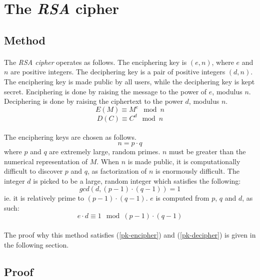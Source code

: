 \documentclass[a4paper, 12pt]{article}
\begin{document}
\section{The \textit{RSA} cipher}
\paragraph*{}

\subsection{Method}
\paragraph*{}
The \textit{RSA cipher} operates as follows. The enciphering key is $(e, n)$, where $e$ and $n$ are positive integers. 
The deciphering key is a pair of positive integers $(d, n)$. The enciphering key is made public by all users, while the
 deciphering key is kept secret. Enciphering is done by raising the message to the power of $e$, modulus $n$. 
Deciphering is done by raising the ciphertext to the power $d$, modulus $n$.
$$E(M) \equiv M^{e} \mod n$$
$$D(C) \equiv C^{d} \mod n$$

\paragraph*{}
The enciphering keys are chosen as follows.
$$n = p \cdot q$$
where $p$ and $q$ are extremely large, random primes. $n$ must be greater than the numerical representation of $M$. 
When $n$ is made public, it is computationally difficult to discover $p$ and $q$, as factorization of $n$ is 
enormously difficult. The integer $d$ is picked to be a large, random integer which satisfies the following:
$$gcd(d, (p - 1) \cdot (q - 1)) = 1$$
ie. it is relatively prime to $(p - 1) \cdot (q - 1)$. $e$ is computed from $p$, $q$ and $d$, as such:
$$e \cdot d \equiv 1 \mod (p-1) \cdot (q-1)$$

\paragraph*{}
The proof why this method satisfies (\ref{pk-encipher}) and (\ref{pk-decipher}) is given in the following section.

\subsection{Proof}
\end{document}
